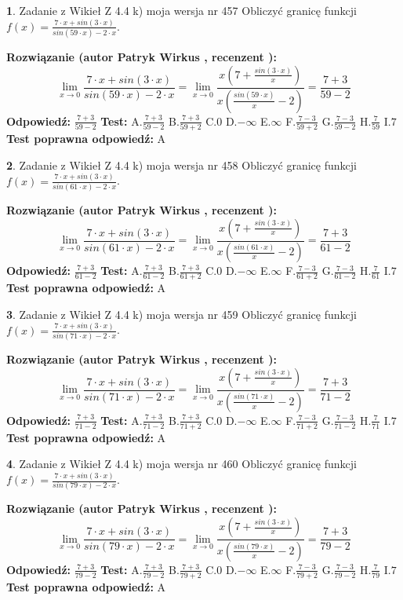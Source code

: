 \documentclass[12pt, a4paper]{article}
\theoremstyle{definition} %
\newtheorem{zad}{}
\newcommand{\zadStart}[1]{\begin{zad}#1\newline}
\newcommand{\zadStop}{\end{zad}}
\newcommand{\rozwStart}[2]{\noindent \textbf{Rozwiązanie (autor #1 , recenzent #2): }\newline}
\newcommand{\rozwStop}{\newline}
\newcommand{\odpStart}{\noindent \textbf{Odpowiedź:}\newline}
\newcommand{\odpStop}{\newline}
\newcommand{\testStart}{\noindent \textbf{Test:}\newline}
\newcommand{\testStop}{\newline}
\newcommand{\kluczStart}{\noindent \textbf{Test poprawna odpowiedź:}\newline}
\newcommand{\kluczStop}{\newline}
\begin{document}
\zadStart{Zadanie z Wikieł Z 4.4 k) moja wersja nr 457}
Obliczyć granicę funkcji $f(x)=\frac{7\cdot x +sin(3\cdot x)}{sin(59\cdot x) -2\cdot x}$.
\zadStop
\rozwStart{Patryk Wirkus}{}
$$\lim\limits_{x\to 0}\frac{7\cdot x +sin(3\cdot x)}{sin(59\cdot x) -2\cdot x}
=\lim\limits_{x\to 0}\frac{x(7+\frac{sin(3\cdot x)}{x})}{x(\frac{sin(59\cdot x)}{x}-2)}
=\frac{7+3}{59-2}$$
\rozwStop
\odpStart
$\frac{7+3}{59-2}$
\odpStop
\testStart
A.$\frac{7+3}{59-2}$
B.$\frac{7+3}{59+2}$
C.$0$
D.$-\infty$
E.$\infty$
F.$\frac{7-3}{59+2}$
G.$\frac{7-3}{59-2}$
H.$\frac{7}{59}$
I.$7$
\testStop
\kluczStart
A
\kluczStop



\zadStart{Zadanie z Wikieł Z 4.4 k) moja wersja nr 458}
Obliczyć granicę funkcji $f(x)=\frac{7\cdot x +sin(3\cdot x)}{sin(61\cdot x) -2\cdot x}$.
\zadStop
\rozwStart{Patryk Wirkus}{}
$$\lim\limits_{x\to 0}\frac{7\cdot x +sin(3\cdot x)}{sin(61\cdot x) -2\cdot x}
=\lim\limits_{x\to 0}\frac{x(7+\frac{sin(3\cdot x)}{x})}{x(\frac{sin(61\cdot x)}{x}-2)}
=\frac{7+3}{61-2}$$
\rozwStop
\odpStart
$\frac{7+3}{61-2}$
\odpStop
\testStart
A.$\frac{7+3}{61-2}$
B.$\frac{7+3}{61+2}$
C.$0$
D.$-\infty$
E.$\infty$
F.$\frac{7-3}{61+2}$
G.$\frac{7-3}{61-2}$
H.$\frac{7}{61}$
I.$7$
\testStop
\kluczStart
A
\kluczStop



\zadStart{Zadanie z Wikieł Z 4.4 k) moja wersja nr 459}
Obliczyć granicę funkcji $f(x)=\frac{7\cdot x +sin(3\cdot x)}{sin(71\cdot x) -2\cdot x}$.
\zadStop
\rozwStart{Patryk Wirkus}{}
$$\lim\limits_{x\to 0}\frac{7\cdot x +sin(3\cdot x)}{sin(71\cdot x) -2\cdot x}
=\lim\limits_{x\to 0}\frac{x(7+\frac{sin(3\cdot x)}{x})}{x(\frac{sin(71\cdot x)}{x}-2)}
=\frac{7+3}{71-2}$$
\rozwStop
\odpStart
$\frac{7+3}{71-2}$
\odpStop
\testStart
A.$\frac{7+3}{71-2}$
B.$\frac{7+3}{71+2}$
C.$0$
D.$-\infty$
E.$\infty$
F.$\frac{7-3}{71+2}$
G.$\frac{7-3}{71-2}$
H.$\frac{7}{71}$
I.$7$
\testStop
\kluczStart
A
\kluczStop



\zadStart{Zadanie z Wikieł Z 4.4 k) moja wersja nr 460}
Obliczyć granicę funkcji $f(x)=\frac{7\cdot x +sin(3\cdot x)}{sin(79\cdot x) -2\cdot x}$.
\zadStop
\rozwStart{Patryk Wirkus}{}
$$\lim\limits_{x\to 0}\frac{7\cdot x +sin(3\cdot x)}{sin(79\cdot x) -2\cdot x}
=\lim\limits_{x\to 0}\frac{x(7+\frac{sin(3\cdot x)}{x})}{x(\frac{sin(79\cdot x)}{x}-2)}
=\frac{7+3}{79-2}$$
\rozwStop
\odpStart
$\frac{7+3}{79-2}$
\odpStop
\testStart
A.$\frac{7+3}{79-2}$
B.$\frac{7+3}{79+2}$
C.$0$
D.$-\infty$
E.$\infty$
F.$\frac{7-3}{79+2}$
G.$\frac{7-3}{79-2}$
H.$\frac{7}{79}$
I.$7$
\testStop
\kluczStart
A
\kluczStop
\end{document}
